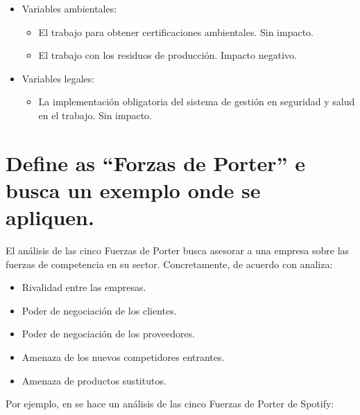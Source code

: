 \documentclass[a4paper]{article}
\begin{document}
\begin{itemize}
\begin{itemize}
    \end{itemize}
    \item Variables ambientales:
    \begin{itemize}
        \item El trabajo para obtener certificaciones ambientales. Sin impacto.
        \item El trabajo con los residuos de producción. Impacto negativo.
    \end{itemize}
    \item Variables legales:
    \begin{itemize}
        \item La implementación obligatoria del sistema de gestión en seguridad y salud en el trabajo. Sin impacto.
    \end{itemize}
\end{itemize}

\section{Define as ``Forzas de Porter'' e busca un exemplo onde se apliquen.}

El análisis de las cinco Fuerzas de Porter busca asesorar a una empresa sobre las fuerzas de competencia en su sector. Concretamente, de acuerdo con \cite{RefWorks:doc:602fb6588f0850dd1efa1bcd} analiza:

\begin{itemize}
    \item Rivalidad entre las empresas.
    \item Poder de negociación de los clientes.
    \item Poder de negociación de los proveedores.
    \item Amenaza de los nuevos competidores entrantes.
    \item Amenaza de productos sustitutos.
\end{itemize}

Por ejemplo, en \cite{RefWorks:doc:602fb9d78f087d63396a4d34} se hace un análisis de las cinco Fuerzas de Porter de Spotify:
\end{document}
